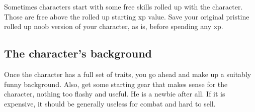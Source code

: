 Sometimes characters start with some free skills rolled up with the character. Those are free above the rolled up starting xp value. Save your original pristine rolled up noob version of your character, as is, before spending any xp.






%
%


\subsection*{The character's background}
Once the character has a full set of traits, you go ahead and make up a suitably funny background. Also, get some starting gear that makes sense for the character, nothing too flashy and useful. He is a newbie after all. If it is expensive, it should be generally useless for combat and hard to sell.


